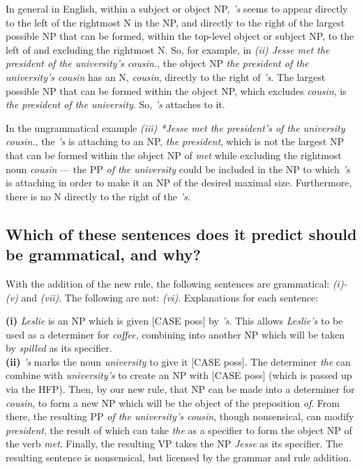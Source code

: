 \documentclass{article}
\begin{document}
\par{In general in English, within a subject or object NP, \textit{'s} seems to appear directly to the left of the rightmost N in the NP, and directly to the right of the largest possible NP that can be formed, within the top-level object or subject NP, to the left of and excluding the rightmost N. So, for example, in \textit{(ii) Jesse met the president of the university's cousin.}, the object NP \textit{the president of the university's cousin} has an N, \textit{cousin}, directly to the right of \textit{'s}. The largest possible NP that can be formed within the object NP, which excludes \textit{cousin}, is \textit{the president of the university}. So, \textit{'s} attaches to it.}\\

\par{In the ungrammatical example \textit{(iii) *Jesse met the president's of the university cousin.}, the \textit{'s} is attaching to an NP, \textit{the president}, which is not the largest NP that can be formed within the object NP of \textit{met} while excluding the rightmost noun \textit{cousin} --- the PP \textit{of the university} could be included in the NP to which \textit{'s} is attaching in order to make it an NP of the desired maximal size. Furthermore, there is no N directly to the right of the \textit{'s}.}

\subsection{Which of these sentences does it predict should be grammatical, and why?}

With the addition of the new rule, the following sentences are grammatical: \textit{(i)-(v)} and \textit{(vii)}. The following are not: \textit{(vi)}. Explanations for each sentence:\\

\parindent=0in

\textbf{(i)} \textit{Leslie} is an NP which is given [{\sc CASE} poss] by \textit{'s}. This allows \textit{Leslie's} to be used as a determiner for \textit{coffee}, combining into another NP which will be taken by \textit{spilled} as its specifier.\\

\textbf{(ii)} \textit{'s} marks the noun \textit{university} to give it [{\sc CASE} poss]. The determiner \textit{the} can combine with \textit{university's} to create an NP with [{\sc CASE} poss] (which is passed up via the HFP). Then, by our new rule, that NP can be made into a determiner for \textit{cousin}, to form a new NP which will be the object of the preposition \textit{of}. From there, the resulting PP \textit{of the university's cousin}, though nonsensical, can modify \textit{president}, the result of which can take \textit{the} as a specifier to form the object NP of the verb \textit{met}. Finally, the resulting VP takes the NP \textit{Jesse} as its specifier. The resulting sentence is nonsensical, but licensed by the grammar and rule addition.\\
\end{document}
